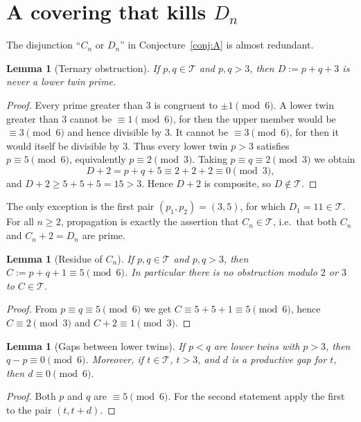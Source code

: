 \documentclass[11pt,a4paper]{article}
\newtheorem{lemma}[theorem]{Lemma}
\theoremstyle{definition}
\theoremstyle{remark}
\newcommand{\T}{\mathcal{T}}
\begin{document}
\section{A covering that kills \texorpdfstring{$D_n$}{D\_n}}\label{sec:cover}

The disjunction ``$C_n$ or $D_n$'' in Conjecture~\ref{conj:A} is almost redundant.

\begin{lemma}[Ternary obstruction]\label{lem:Dn}
If $p,q\in\T$ and $p,q>3$, then $D := p+q+3$ is never a lower twin prime.
\end{lemma}

\begin{proof}
Every prime greater than $3$ is congruent to $\pm1 \pmod 6$.
A lower twin greater than $3$ cannot be $\equiv 1\pmod 6$, for then the upper member would be $\equiv 3\pmod 6$ and hence divisible by $3$.
It cannot be $\equiv 3\pmod 6$, for then it would itself be divisible by $3$.
Thus every lower twin $p>3$ satisfies $p\equiv 5\pmod 6$, equivalently $p\equiv 2\pmod 3$.
Taking $p\equiv q\equiv 2\pmod 3$ we obtain
\[
D+2 = p+q+5 \equiv 2+2+2 \equiv 0 \pmod 3,
\]
and $D+2\ge 5+5+5 = 15>3$. Hence $D+2$ is composite, so $D\notin\T$.
\end{proof}

The only exception is the first pair $(p_1,p_2) = (3,5)$, for which $D_1 = 11\in\T$.
For all $n\ge 2$, propagation is exactly the assertion that $C_n\in\T$, i.e.\ that both $C_n$ and $C_n+2 = D_n$ are prime.

\begin{lemma}[Residue of $C_n$]\label{lem:Cn}
If $p,q\in\T$ and $p,q>3$, then $C := p+q+1\equiv 5\pmod 6$.
In particular there is no obstruction modulo $2$ or $3$ to $C\in\T$.
\end{lemma}

\begin{proof}
From $p\equiv q\equiv 5\pmod 6$ we get $C\equiv 5+5+1\equiv 5\pmod 6$, hence $C\equiv 2\pmod 3$ and $C+2\equiv 1\pmod 3$.
\end{proof}

\begin{lemma}[Gaps between lower twins]\label{lem:mod6}
If $p<q$ are lower twins with $p>3$, then $q-p\equiv 0\pmod 6$.
Moreover, if $t\in\T$, $t>3$, and $d$ is a productive gap for $t$, then $d\equiv 0\pmod 6$.
\end{lemma}

\begin{proof}
Both $p$ and $q$ are $\equiv 5\pmod 6$. For the second statement apply the first to the pair $(t, t+d)$.
\end{proof}
\end{document}
